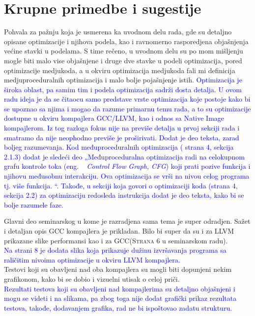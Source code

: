 \documentclass[a4paper]{report}
\newcommand{\odgovor}[1]{\textcolor{blue}{#1}}
\begin{document}
\section{Krupne primedbe i sugestije}

Pohvala za pažnju koja je usmerena ka uvodnom delu rada, gde su detaljno opisane optimizacije i njihova podela, kao i ravnomerno rasporedjena objašnjenja većine stavki u podelama. S time rečeno, u uvodnom delu su po mom mišljenju mogle biti malo vise objašnjene i druge dve stavke u podeli optimizacija, pored optimizacije medjukoda, a u okviru optimizacija medjukoda fali mi definicija medjuproceduralnih optimizacija i malo bolje pojašnjenje istih. 
\odgovor{ Optimizacija je široka oblast, pa samim tim i podela optimizacija sadrži dosta detalja. U ovom radu ideja je da se čitaocu samo predstave vrste optimizacija koje postoje kako bi se 
          upoznao sa njima i mogao da razume primarnu temu rada, a to su optimizacije dostupne u okviru kompajlera GCC/LLVM, kao i odnos sa Native Image kompajlerom.
          Iz tog razloga fokus nije na previše detalja u prvoj sekciji rada i smatramo da nije neophodno previše je proširivati. Dodat je deo teksta, zarad boljeg razumevanja.
          Kod međuproceduralnih optimizacija ( strana 4, sekcija 2.1.3) dodat je sledeći deo 
          „Međuproceduralna optimizacija radi na celokupnom grafu kontrole toka (eng. ~ {\em Control Flow Graph, CFG}) koji prati pozive funkcija i njihovu međusobnu interakciju. 
          Ova optimizacija se vrši na nivou celog programa tj. više funkcija. “.
          Takođe, u sekciji koja govori o optimizaciji koda (strana 4, sekcija 2.2) za optimizaciju redosleda instrukcija dodat je deo teksta, kako bi se bolje razumele faze. 
}

Glavni deo seminarskog u kome je razradjena sama tema je super odradjen. Sažet i detaljan opis GCC kompajlera je prikladan. Bilo bi super da su i za LLVM prikazane slike performansi kao i za GCC(\textsc{Strana 6} u seminarskom radu). \\
\odgovor{Na strani 8 je dodata slika koja prikazuje dužinu izvršavanja programa sa raličitim nivoima optimizacije u okviru LLVM kompajlera.} \\ Testovi koji su obavljeni nad oba kompajlera su mogli biti dopunjeni nekim grafikonom, kako bi se dobio i vizuelni utisak o celoj priči. \\ \odgovor{Rezultati testova koji su obavljeni nad kompajlerima su detaljno objašnjeni i mogu se videti i na slikama, pa zbog toga nije dodat grafički prikaz rezultata testova, takođe, dodavanjem grafika, rad ne bi ispoštovao zadatu strukturu.}
\end{document}
